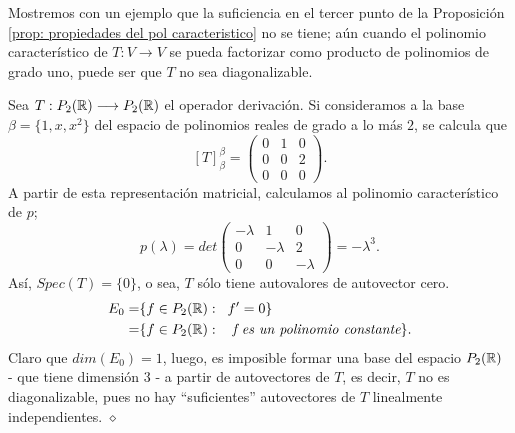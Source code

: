 \QEDB
\vspace{0.2cm}

Mostremos con un ejemplo que la suficiencia en el tercer
punto de la Proposición 
\ref{prop: propiedades del pol caracteristico}
no se tiene; aún cuando el polinomio
característico de $T: V \longrightarrow V$ se pueda factorizar
como producto de polinomios de grado uno, puede ser que $T$
no sea diagonalizable.

\begin{ejem}
	\label{ej: de un operador con polinomio caract factorizable en pol de grado uno que no es diagonalizable}
	Sea $T: P_{2}(\mathbb{R}) \longrightarrow P_{2}(\mathbb{R})$ el operador 
	derivación. Si consideramos a la base
	$\beta = \{ 1, x, x^{2} \}$ del espacio de polinomios reales
	de grado a lo más $2$, se calcula que 
	\[
	[T]_{\beta}^{\beta} = \begin{pmatrix}
		0 & 1 & 0 \\
		0 & 0 & 2 \\
		0 & 0 & 0
	\end{pmatrix}.
	\]
	A partir de esta representación matricial, calculamos al
	polinomio característico de $p$;
	\[
	p(\lambda) = det 
	\begin{pmatrix}
		-\lambda & 1 & 0 \\
		0 &-\lambda & 2 \\
		0 & 0 & - \lambda
	\end{pmatrix} = - \lambda^{3}.
	\]
	Así, $Spec(T) = \{0\}$, o sea, $T$ sólo tiene autovalores de 
	autovector cero.
	\begin{align*}
		E_{0} = & \{f \in P_{2}(\mathbb{R}) : \hspace{0.2cm} f' = 0 \} \\
		= & \{f \in P_{2}(\mathbb{R}) : \hspace{0.2cm} \textit{ f es un polinomio constante} \}.
	\end{align*}
	Claro que $dim(E_{0}) = 1$, luego, es imposible formar una base 
	del espacio $P_{2}(\mathbb{R})$ - que tiene dimensión $3$ - a partir de
	autovectores de $T$, es decir, $T$ no es diagonalizable, pues 
	no hay ``suficientes'' autovectores de $T $ linealmente independientes.
	$\diamond$
\end{ejem}

